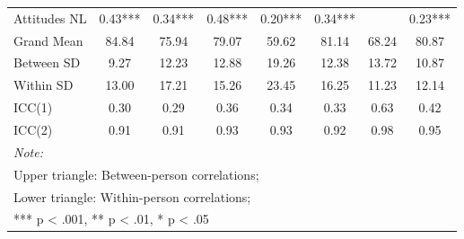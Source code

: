 \begin{table}
\begin{minipage}[t][\textheight][t]{\textwidth}
{\begin{tabular}[t]{lccccccc}
\hspace{1em}Attitudes NL & 0.43*** & 0.34*** & 0.48*** & 0.20*** & 0.34*** &  & 0.23***\\
\addlinespace
\hspace{1em}Grand Mean & 84.84 & 75.94 & 79.07 & 59.62 & 81.14 & 68.24 & 80.87\\
\hspace{1em}Between SD & 9.27 & 12.23 & 12.88 & 19.26 & 12.38 & 13.72 & 10.87\\
\hspace{1em}Within SD & 13.00 & 17.21 & 15.26 & 23.45 & 16.25 & 11.23 & 12.14\\
\hspace{1em}ICC(1) & 0.30 & 0.29 & 0.36 & 0.34 & 0.33 & 0.63 & 0.42\\
\hspace{1em}ICC(2) & 0.91 & 0.91 & 0.93 & 0.93 & 0.92 & 0.98 & 0.95\\
\bottomrule
\multicolumn{8}{l}{\rule{0pt}{1em}\textit{Note: }}\\
\multicolumn{8}{l}{\rule{0pt}{1em}Upper triangle: Between-person correlations;}\\
\multicolumn{8}{l}{\rule{0pt}{1em}Lower triangle: Within-person correlations;}\\
\multicolumn{8}{l}{\rule{0pt}{1em}*** p < .001, ** p < .01,  * p < .05}\\
\end{tabular}}
\end{minipage}
\end{table}
